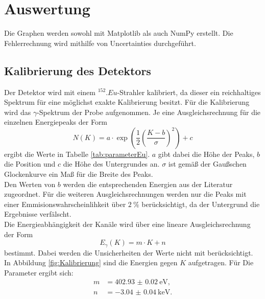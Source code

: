 \section{Auswertung}
\label{sec:Auswertung}

Die Graphen werden sowohl mit Matplotlib \cite{matplotlib} als auch NumPy \cite{numpy} erstellt. Die Fehlerrechnung wird mithilfe von Uncertainties \cite{uncertainties} durchgeführt.

\subsection{Kalibrierung des Detektors}

Der Detektor wird mit einem $^{152}.{Eu}$-Strahler kalibriert, da dieser ein reichhaltiges Spektrum für eine möglichst exakte Kalibrierung besitzt.
Für die Kalibrierung wird das $\gamma$-Spektrum der Probe aufgenommen. Je eine Ausgleichsrechnung für die einzelnen Energiepeaks der Form
\begin{equation}
N(K)=a \cdot\exp\left(\frac{1}{2}\left(\frac{K-b}{\sigma}\right)^2\right)+c \label{eq:gaussFit}
\end{equation}
ergibt die Werte in Tabelle \ref{tab:parameterEu}. $a$ gibt dabei die Höhe der Peaks, $b$ die Position und $c$ die Höhe des Untergrundes an. $\sigma$ ist gemäß der Gaußschen Glockenkurve ein Maß für die Breite des Peaks.\\
Den Werten von $b$ werden die entsprechenden Energien aus der Literatur \cite{MARTIN20131497} zugeordnet.
Für die weiteren Ausgleichsrechnungen werden nur die Peaks mit einer Emmisionswahrscheinlihkeit über $\SI{2}{\percent}$ berücksichtigt, da der Untergrund die Ergebnisse verfälscht.\\
Die Energieabhängigkeit der Kanäle wird über eine lineare Ausgleichsrechnung der Form
\[
E_\gamma(K) = m\cdot K+n
\]  
bestimmt. Dabei werden die Unsicherheiten der Werte nicht mit berücksichtigt. In Abbildung \ref{fig:Kalibrierung} sind die Energien gegen $K$ aufgetragen.
Für Die Parameter ergibt sich:
\begin{align*}
m	&=	\SI{402.93(2)}{\electronvolt}\text{,}\\
n	&=	\SI{-3.04(4)}{\kilo\electronvolt}\text{.}
\end{align*}

